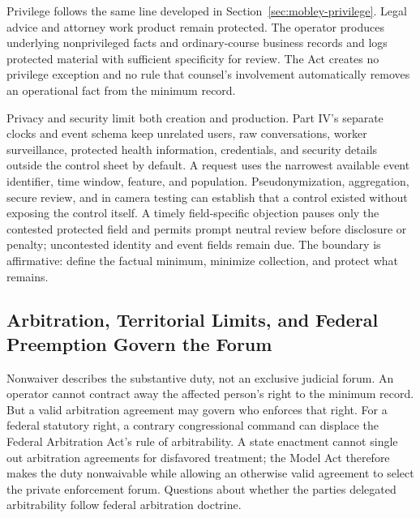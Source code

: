 Privilege follows the same line developed in Section~\ref{sec:mobley-privilege}. Legal advice and attorney work product remain protected. The operator produces underlying nonprivileged facts and ordinary-course business records and logs protected material with sufficient specificity for review. The Act creates no privilege exception and no rule that counsel's involvement automatically removes an operational fact from the minimum record.

Privacy and security limit both creation and production. Part IV's separate clocks and event schema keep unrelated users, raw conversations, worker surveillance, protected health information, credentials, and security details outside the control sheet by default. A request uses the narrowest available event identifier, time window, feature, and population. Pseudonymization, aggregation, secure review, and in camera testing can establish that a control existed without exposing the control itself. A timely field-specific objection pauses only the contested protected field and permits prompt neutral review before disclosure or penalty; uncontested identity and event fields remain due. The boundary is affirmative: define the factual minimum, minimize collection, and protect what remains.

\subsection{Arbitration, Territorial Limits, and Federal Preemption Govern the Forum}

Nonwaiver describes the substantive duty, not an exclusive judicial forum. An operator cannot contract away the affected person's right to the minimum record. But a valid arbitration agreement may govern who enforces that right. For a federal statutory right, a contrary congressional command can displace the Federal Arbitration Act's rule of arbitrability. A state enactment cannot single out arbitration agreements for disfavored treatment; the Model Act therefore makes the duty nonwaivable while allowing an otherwise valid agreement to select the private enforcement forum. Questions about whether the parties delegated arbitrability follow federal arbitration doctrine.

